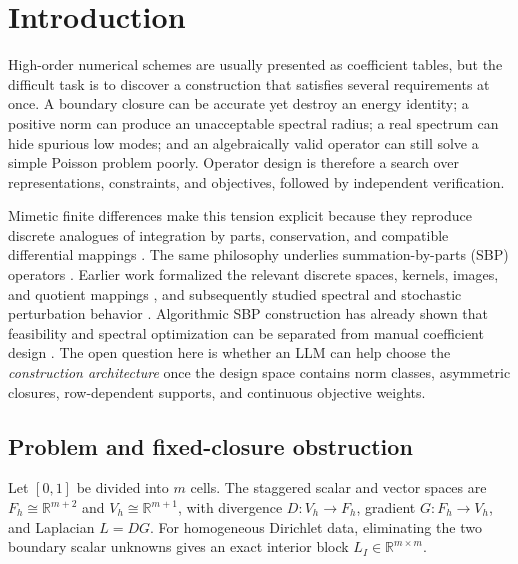 \documentclass[lineno,pdflatex,sn-nature]{sn-jnl}
\newcommand{\R}{\mathbb{R}}
\theoremstyle{thmstyleone}
\begin{document}

\maketitle

\section{Introduction}
High-order numerical schemes are usually presented as coefficient tables, but the difficult task is to discover a construction that satisfies several requirements at once. A boundary closure can be accurate yet destroy an energy identity; a positive norm can produce an unacceptable spectral radius; a real spectrum can hide spurious low modes; and an algebraically valid operator can still solve a simple Poisson problem poorly. Operator design is therefore a search over representations, constraints, and objectives, followed by independent verification.

Mimetic finite differences make this tension explicit because they reproduce discrete analogues of integration by parts, conservation, and compatible differential mappings \cite{castillo2003matrix,corbino2020high,lipnikov2014mimetic,bochev2006principles}. The same philosophy underlies summation-by-parts (SBP) operators \cite{strand1994summation,mattsson2013block,mattsson2014optimal}. Earlier work formalized the relevant discrete spaces, kernels, images, and quotient mappings \cite{decurto2024isomorphic}, and subsequently studied spectral and stochastic perturbation behavior \cite{decurto2024spectral}. Algorithmic SBP construction has already shown that feasibility and spectral optimization can be separated from manual coefficient design \cite{albin2016algorithmic}. The open question here is whether an LLM \cite{trinh2024alphageometry,wang2023scientific} can help choose the \emph{construction architecture} once the design space contains norm classes, asymmetric closures, row-dependent supports, and continuous objective weights.

\subsection{Problem and fixed-closure obstruction}
Let $[0,1]$ be divided into $m$ cells. The staggered scalar and vector spaces are $F_h\cong\R^{m+2}$ and $V_h\cong\R^{m+1}$, with divergence $D:V_h\rightarrow F_h$, gradient $G:F_h\rightarrow V_h$, and Laplacian $L=DG$. For homogeneous Dirichlet data, eliminating the two boundary scalar unknowns gives an exact interior block $L_I\in\R^{m\times m}$.
\end{document}
